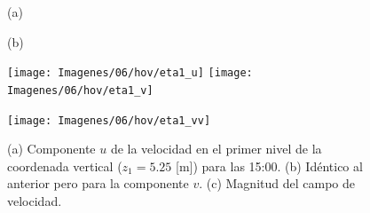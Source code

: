 \begin{figure}[H]
	\centering
	\begin{minipage}{0.5\linewidth}
		\center\hspace{0.3cm}(a)
	\end{minipage}%
	\begin{minipage}{0.5\linewidth}
		\center\hspace{0.3cm}(b)
	\end{minipage}%
	
	\texttt{[image: Imagenes/06/hov/eta1\_u]}%
	\texttt{[image: Imagenes/06/hov/eta1\_v]}%
	
	
	\texttt{[image: Imagenes/06/hov/eta1\_vv]}%
	\caption{(a) Componente $u$ de la velocidad en el primer nivel de la coordenada vertical ($z_1=5.25$ [m]) para las 15:00. (b) Idéntico al anterior pero para la componente $v$. (c) Magnitud del campo de velocidad.}
	\label{fig:06_hov_eta1}
\end{figure}

